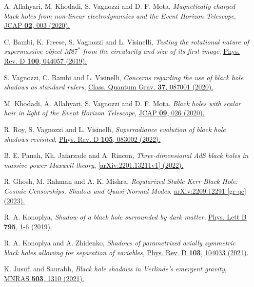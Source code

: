\documentclass[aps,amsmath,amssymb,showpacs,showkeys]{revtex4}
\begin{document}
\begin{thebibliography}{99}
A. Allahyari, M. Khodadi, S. Vagnozzi and D. F. Mota, \textit{Magnetically charged black holes from non-linear electrodynamics and the Event Horizon Telescope}, \href{https://iopscience.iop.org/article/10.1088/1475-7516/2020/02/003}{JCAP \textbf{02}, 003 (2020).}

C. Bambi, K. Freese, S. Vagnozzi and L. Visinelli, \textit{Testing the rotational nature of supermassive object $M87^*$ from the circularity and size of its first image}, \href{https://journals.aps.org/prd/abstract/10.1103/PhysRevD.100.044057}{Phys. Rev. D \textbf{100}, 044057 (2019).}

S. Vagnozzi, C. Bambi and L. Visinelli, \textit{Concerns regarding the use of black hole shadows as standard rulers}, \href{https://iopscience.iop.org/article/10.1088/1361-6382/ab7965}{Class. Quantum Grav. \textbf{37}, 087001 (2020).}

M. Khodadi, A. Allahyari, S. Vagnozzi and D. F. Mota, \textit{Black holes with scalar hair in light of the Event Horizon Telescope}, \href{https://iopscience.iop.org/article/10.1088/1475-7516/2020/09/026}{JCAP \textbf{09}, 026 (2020).}

R. Roy, S. Vagnozzi and L. Visinelli, \textit{Superradiance evolution of black hole shadows revisited}, \href{https://journals.aps.org/prd/abstract/10.1103/PhysRevD.105.083002}{Phys. Rev. D \textbf{105}, 083002 (2022).}


B. E. Panah, Kh. Jafarzade and A. Rincon, \textit{Three-dimensional AdS black holes in massive-power-Maxwell theory}, \href{https://doi.org/10.48550/arXiv.2201.13211}{[arXiv:2201.13211v1] (2022).}


R. Ghosh, M. Rahman and A. K. Mishra, \textit{Regularized Stable Kerr Black Hole: Cosmic Censorships, Shadow and Quasi-Normal Modes}, \href{https://arxiv.org/abs/2209.12291}{arXiv:2209.12291 [gr-qc] (2023).}

R. A. Konoplya, \textit{Shadow of a black hole surrounded by dark matter}, \href{https://www.sciencedirect.com/science/article/pii/S0370269319303648?via%3Dihub}{Phys. Lett B \textbf{795}, 1-6 (2019).}

R. A. Konoplya and A. Zhidenko, \textit{Shadows of parametrized axially symmetric black holes allowing for separation of variables}, \href{https://journals.aps.org/prd/abstract/10.1103/PhysRevD.103.104033}{Phys. Rev. D \textbf{103}, 104033 (2021).}

K. Jusufi and Saurabh, \textit{ Black hole shadows in Verlinde’s emergent gravity}, \href{https://academic.oup.com/mnras/article-abstract/503/1/1310/6144591?redirectedFrom=fulltext&login=true}{MNRAS \textbf{503}, 1310 (2021).}


\end{thebibliography}
\end{document}

